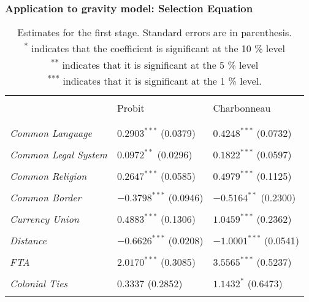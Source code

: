 \begin{frame}
    \frametitle{Application to gravity model: Selection Equation}
    \begin{table}
        \fontsize{8}{8}\selectfont
        \centering
        \begin{threeparttable}
        \captionsetup{font=scriptsize}
        \begin{tabular}{p{4cm}p{1.8cm}p{1.8cm}}
          \hline
          \\[-0.5em]
           \quad & Probit  & Charbonneau \\
           \\[-0.5em]
           \hline
           \\[-0.5em]
            \textit{Common Language}  &  $0.2903^{***}$ (0.0379) &  $0.4248^{***}$ (0.0732) \\
            \\[-0.5em]
            \textit{Common Legal System}  &  $0.0972^{**}$ (0.0296) &  $0.1822^{***}$ (0.0597)\\
            \\[-0.5em]
            \textit{Common Religion} & $0.2647^{***}$ (0.0585)&  $0.4979^{***}$ (0.1125)\\
            \\[-0.5em]
            \textit{Common Border} & $-0.3798^{***}$ (0.0946) &  $-0.5164^{**}$ (0.2300)\\
            \\[-0.5em]
            \textit{Currency Union} &  $0.4883^{***}$ (0.1306) &  $1.0459^{***}$ (0.2362)\\
            \\[-0.5em]
            \textit{Distance}  & $-0.6626^{***}$ (0.0208) &  $-1.0001^{***}$ (0.0541)\\
            \\[-0.5em]
            \textit{FTA} &  $2.0170^{***}$ (0.3085) & $3.5565^{***}$ (0.5237)\\
            \\[-0.5em]
            \textit{Colonial Ties} &  $0.3337$ (0.2852) &  $1.1432^{*}$ (0.6473)\\
             & &  \\
            \hline
        \end{tabular}
        \caption{{Estimates for the first stage. Standard errors are in parenthesis. \\
        \textsuperscript{*} indicates that the coefficient is significant at the 10 \% level \\
        \textsuperscript{**} indicates that it is significant at the 5 \% level \\ \textsuperscript{***} indicates that it is significant at the 1 \% level.}}
    \end{threeparttable}
        \label{tab:app1}
    \end{table}
\end{frame}

